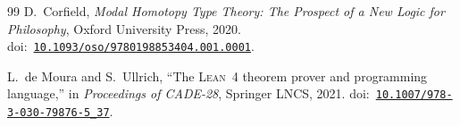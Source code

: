 \documentclass[10pt, letterpaper]{article}
\theoremstyle{definition}
\theoremstyle{remark}
\begin{document}
\begin{thebibliography}{99}
D.~Corfield,
\emph{Modal Homotopy Type Theory: The Prospect of a New Logic
for Philosophy},
Oxford University Press, 2020.
\newline doi:~\href{https://doi.org/10.1093/oso/9780198853404.001.0001}{\texttt{10.1093/oso/9780198853404.001.0001}}.

L.~de Moura and S.~Ullrich,
``The \textsc{Lean}~4 theorem prover and programming language,''
in \emph{Proceedings of CADE-28}, Springer LNCS, 2021.
\newline doi:~\href{https://doi.org/10.1007/978-3-030-79876-5_37}{\texttt{10.1007/978-3-030-79876-5\_37}}.

\end{thebibliography}
\end{document}
